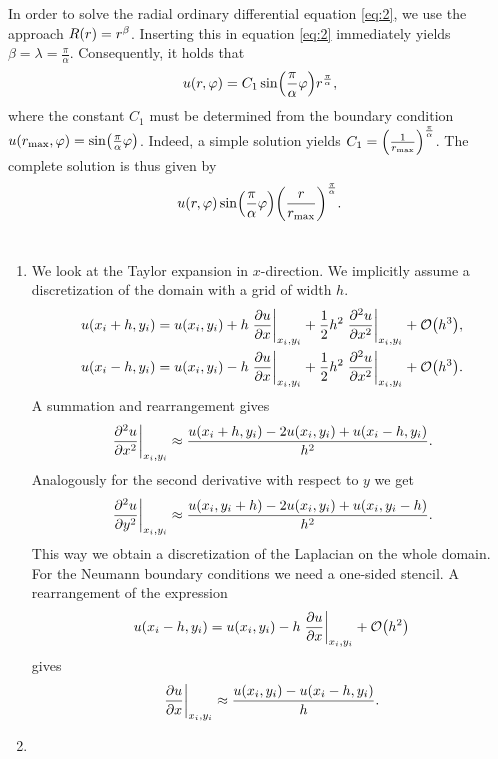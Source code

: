 \documentclass[english]{exercise}
\begin{document}
\begin{enumerate}
\[		\]
		In order to solve the radial ordinary differential equation \eqref{eq:2}, we use the approach \(R\parentheses*{r} = r^\beta\).
		Inserting this in equation \eqref{eq:2} immediately yields \(\beta = \lambda = \frac{\pi}{\alpha}\).
		Consequently, it holds that
		\[
			u\parentheses*{r, \varphi} = C_1 \sin\parentheses*{\frac{\pi}{\alpha}\varphi}r^{\frac{\pi}{\alpha}},
		\]
		where the constant \(C_1\) must be determined from the boundary condition \(u\parentheses*{r_{\text{max}}, \varphi} = \sin\parentheses*{\frac{\pi}{\alpha}\varphi}\).
		Indeed, a simple solution yields \(C_1 = \parentheses*{\frac{1}{r_{\text{max}}}}^{\frac{\pi}{\alpha}}\).
		The complete solution is thus given by
		\[
			u\parentheses*{r, \varphi}\sin\parentheses*{\frac{\pi}{\alpha}\varphi}\parentheses*{\frac{r}{r_{\text{max}}}}^{\frac{\pi}{\alpha}}.
		\]
	\end{enumerate}


	\section{}

	\begin{enumerate}
		\item We look at the Taylor expansion in \(x\)-direction.
		We implicitly assume a discretization of the domain with a grid of width \(h\).
		\begin{align*}
			u\parentheses*{x_i + h, y_i} &= u\parentheses*{x_i, y_i} + h\left.\frac{\partial u}{\partial x}\right|_{x_i, y_i} + \frac{1}{2}h^2 \left.\frac{\partial^2 u}{\partial x^2}\right|_{x_i, y_i} + \mathcal{O}\parentheses*{h^3},\\
			u\parentheses*{x_i - h, y_i} &= u\parentheses*{x_i, y_i} - h\left.\frac{\partial u}{\partial x}\right|_{x_i, y_i} + \frac{1}{2}h^2 \left.\frac{\partial^2 u}{\partial x^2}\right|_{x_i, y_i} + \mathcal{O}\parentheses*{h^3}.
		\end{align*}
		A summation and rearrangement gives
		\[
			\left.\frac{\partial^2 u}{\partial x^2}\right|_{x_i, y_i} \approx \frac{u\parentheses*{x_i + h, y_i} - 2u\parentheses*{x_i, y_i} + u\parentheses*{x_i - h, y_i}}{h^2}.
		\]
		Analogously for the second derivative with respect to \(y\) we get
		\[
			\left.\frac{\partial^2 u}{\partial y^2}\right|_{x_i, y_i} \approx \frac{u\parentheses*{x_i, y_i + h} - 2u\parentheses*{x_i, y_i} + u\parentheses*{x_i, y_i - h}}{h^2}.
		\]
		This way we obtain a discretization of the Laplacian on the whole domain.
		For the Neumann boundary conditions we need a one-sided stencil.
		A rearrangement of the expression
		\[
			u\parentheses*{x_i - h, y_i} = u\parentheses*{x_i, y_i} - h\left.\frac{\partial u}{\partial x}\right|_{x_i, y_i} + \mathcal{O}\parentheses*{h^2}
		\]
		gives
		\[
			\left.\frac{\partial u}{\partial x}\right|_{x_i, y_i} \approx \frac{u\parentheses*{x_i, y_i} - u\parentheses*{x_i - h, y_i}}{h}.
		\]
		\item
	\end{enumerate}
\end{document}
